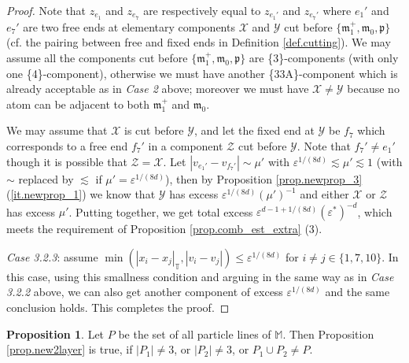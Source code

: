 \documentclass[10pt, reqno]{amsart}
\newcommand{\Mb}{\mathbb M}
\newcommand{\Tb}{\mathbb T}
\newcommand{\Xc}{\mathcal X}
\newcommand{\Yc}{\mathcal Y}
\newcommand{\Zc}{\mathcal Z}
\newcommand{\mf}{\mathfrak m}
\newcommand{\pf}{\mathfrak p}
\theoremstyle{definition}
\newtheorem{proposition}[theorem]{Proposition}
\theoremstyle{remark}
\numberwithin{equation}{section}
\begin{document}
\begin{proof}
Note that $z_{e_1}$ and $z_{e_7}$ are respectively equal to $z_{e_1'}$ and $z_{e_7'}$ where $e_1'$ and $e_7'$ are two free ends at elementary components $\Xc$ and $\Yc$ cut before $\{\mf_1^+,\mf_0,\pf\}$ (cf. the pairing between free and fixed ends in Definition \ref{def.cutting}). We may assume all the components cut before $\{\mf_1^+,\mf_0,\pf\}$ are \{3\}-components (with only one \{4\}-component), otherwise we must have another \{33A\}-component which is already acceptable as in \emph{Case 2} above; moreover we must have $\Xc\neq\Yc$ because no atom can be adjacent to both $\mf_1^+$ and $\mf_0$.

We may assume that $\Xc$ is cut before $\Yc$, and let the fixed end at $\Yc$ be $f_7$ which corresponds to a free end $f_7'$ in a component $\Zc$ cut before $\Yc$. Note that $f_7'\neq e_1'$ though it is possible that $\Zc=\Xc$. Let $|v_{e_1'}-v_{f_7'}|\sim \mu'$ with $\varepsilon^{1/(8d)}\lesssim\mu'\lesssim 1$ (with $\sim$ replaced by $\lesssim$ if $\mu'=\varepsilon^{1/(8d)}$), then by Proposition \ref{prop.newprop_3} (\ref{it.newprop_1}) we know that $\Yc$ has excess $\varepsilon^{1/(8d)}(\mu')^{-1}$ and either $\Xc$ or $\Zc$ has excess $\mu'$. Putting together, we get total excess $\varepsilon^{d-1+1/(8d)}(\varepsilon^*)^{-d}$, which meets the requirement of Proposition \ref{prop.comb_est_extra} (3).

\emph{Case 3.2.3}: assume $\min(|x_i-x_j|_\Tb,|v_i-v_j|)\leq \varepsilon^{1/(8d)}$ for $i\neq j\in\{1,7,10\}$. In this case, using this smallness condition and arguing in the same way as in \emph{Case 3.2.2} above, we can also get another component of excess $\varepsilon^{1/(8d)}$ and the same conclusion holds. This completes the proof.
\end{proof}
\begin{proposition}\label{prop.newcase_2} Let $P$ be the set of all particle lines of $\Mb$. Then Proposition \ref{prop.new2layer} is true, if $|P_1|\neq 3$, or $|P_2|\neq 3$, or $P_1\cup P_2\neq P$.
\end{proposition}
\end{document}

